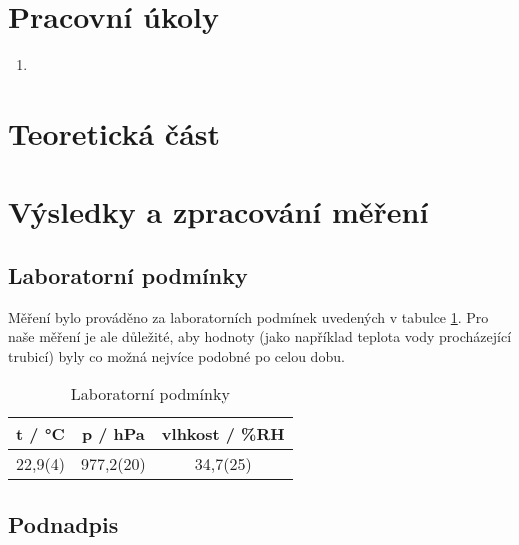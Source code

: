 \section{Pracovní úkoly}

\begin{enumerate}
\item 


\end{enumerate}

\section{Teoretická část}

\section{Výsledky a zpracování měření}

\subsection{Laboratorní podmínky}

    Měření bylo prováděno za laboratorních podmínek uvedených v tabulce \ref{tab:lab_pod}. Pro naše měření je ale důležité, aby hodnoty (jako například teplota vody procházející  trubicí) byly co možná nejvíce podobné po celou dobu.

    \begin{table}[h]
        \centering
        \begin{tabular}{|c|c|c|} 
        \hline
            t / °C & p / hPa & vlhkost / \%RH  \\ 
        \hline
            22,9(4)   & 977,2(20)   & 34,7(25)            \\
        \hline
        \end{tabular}
        \caption{Laboratorní podmínky}
        \label{tab:lab_pod}
    \end{table}

\subsection{Podnadpis}

